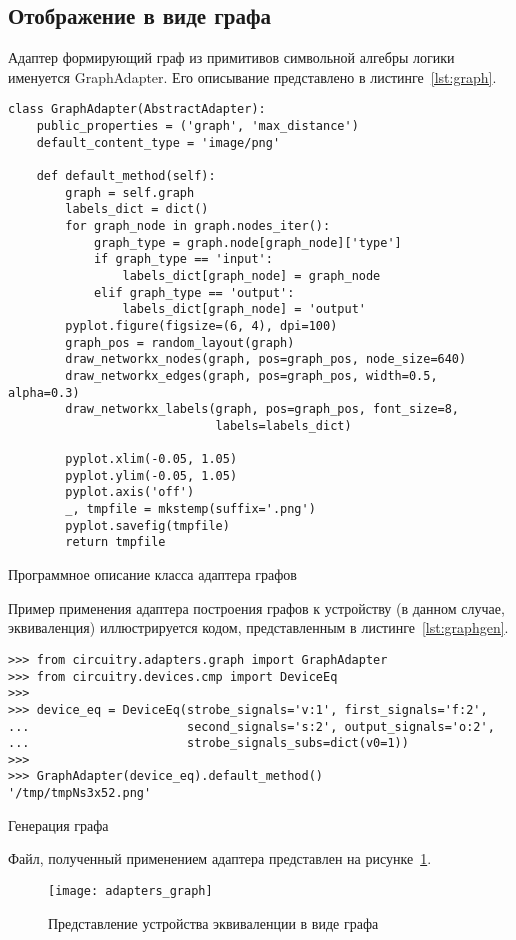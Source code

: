 \documentclass[document.tex]{subfiles}
\begin{document}
\clearpage
\subsection{Отображение в виде графа}
Адаптер формирующий граф из примитивов символьной алгебры логики именуется
GraphAdapter. Его описывание представлено в листинге~\ref{lst:graph}.

\begin{listing}[ht]
\begin{verbatim}
class GraphAdapter(AbstractAdapter):
    public_properties = ('graph', 'max_distance')
    default_content_type = 'image/png'

    def default_method(self):
        graph = self.graph
        labels_dict = dict()
        for graph_node in graph.nodes_iter():
            graph_type = graph.node[graph_node]['type']
            if graph_type == 'input':
                labels_dict[graph_node] = graph_node
            elif graph_type == 'output':
                labels_dict[graph_node] = 'output'
        pyplot.figure(figsize=(6, 4), dpi=100)
        graph_pos = random_layout(graph)
        draw_networkx_nodes(graph, pos=graph_pos, node_size=640)
        draw_networkx_edges(graph, pos=graph_pos, width=0.5, alpha=0.3)
        draw_networkx_labels(graph, pos=graph_pos, font_size=8, 
                             labels=labels_dict)

        pyplot.xlim(-0.05, 1.05)
        pyplot.ylim(-0.05, 1.05)
        pyplot.axis('off')
        _, tmpfile = mkstemp(suffix='.png')
        pyplot.savefig(tmpfile)
        return tmpfile

\end{verbatim}
\caption{Программное описание класса адаптера графов}
\label{lst:graph}
\end{listing}

Пример применения адаптера построения графов к устройству (в данном случае,
эквиваленция) иллюстрируется кодом, представленным в
листинге~\ref{lst:graphgen}.

\begin{listing}[ht]
\begin{verbatim}
>>> from circuitry.adapters.graph import GraphAdapter                   
>>> from circuitry.devices.cmp import DeviceEq 
>>>
>>> device_eq = DeviceEq(strobe_signals='v:1', first_signals='f:2',
...                      second_signals='s:2', output_signals='o:2',
...                      strobe_signals_subs=dict(v0=1))
>>>
>>> GraphAdapter(device_eq).default_method()
'/tmp/tmpNs3x52.png'
\end{verbatim}
\caption{Генерация графа}
\label{lst:graphgen}
\end{listing}

\clearpage
Файл, полученный применением адаптера
представлен на рисунке~\ref{fig:adapters_graph}.

\begin{figure}[here]
\texttt{[image: adapters\_graph]}
\caption{Представление устройства эквиваленции в виде графа}
\label{fig:adapters_graph}
\end{figure}
\end{document}
